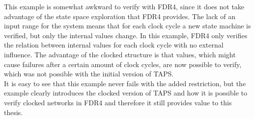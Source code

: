 This example is somewhat awkward to verify with FDR4, since it does not take advantage of the state space exploration that FDR4 provides. The lack of an input range for the system means that for each clock cycle a new state machine is verified, but only the internal values change. In this example, FDR4 only verifies the relation between internal values for each clock cycle with no external influence. The advantage of the clocked structure is that values, which might cause failures after a certain amount of clock cycles, are now possible to verify, which was not possible with the initial version of TAPS. \\

It is easy to see that this example never fails with the added restriction, but the example clearly introduces the clocked version of TAPS and how it is possible to verify clocked networks in FDR4 and therefore it still provides value to this thesis.


